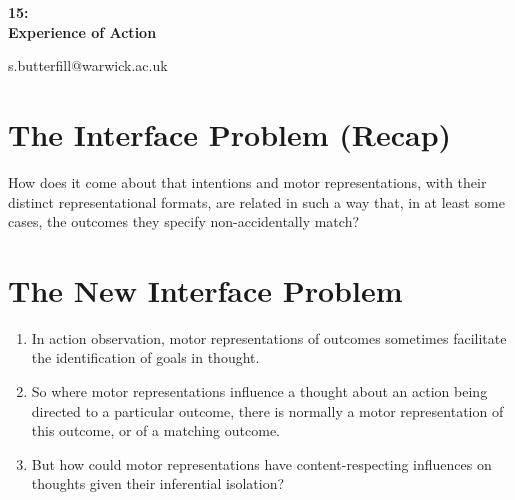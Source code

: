 \documentclass[12pt]{extarticle}
\date{}
\makeatletter
\def \ititle {Philosophical Psychology}
\def \iemail{s.butterfill@warwick.ac.uk}
\makeatother
\begin{document}
\begin{multicols*}{3}

\setlength\footnotesep{1em}









      
\def \ititle {15: \\ Experience of Action}
 
\begin{center}
 
{\Large
 
\textbf{\ititle}
 
}
 
 
 
\iemail %
 
\end{center}
 
 
 
\section{The Interface Problem (Recap)}
 
How does it come about that intentions and motor representations, with their distinct
representational formats, are related in such a way that, in at least some cases, the outcomes they
specify non-accidentally match?

 
 
\section{The New Interface Problem}

\begin{enumerate} 
\item In action observation, motor representations of outcomes
sometimes facilitate the identification of goals in thought.

\item So where motor representations influence a thought about an action being directed to a particular outcome, there is normally a motor representation of this outcome, or of a matching outcome.

\item But how could motor representations have content-respecting influences on thoughts given their inferential isolation?
\end{enumerate}
 

\end{multicols*}
\end{document}
